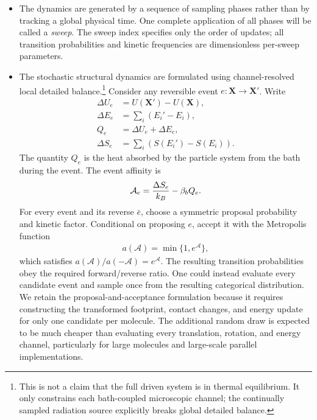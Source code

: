 \documentclass[12pt,letterpaper]{article}
\newcommand{\mb}{\mathbf}
\newcommand{\mc}{\mathcal}
\begin{document}
\begin{itemize}
The nearest-neighbor edges of the square lattice are partitioned into four matching classes according to orientation and parity. Within a class no two edges share an endpoint, so all proposals are sampled in parallel. The four classes are applied sequentially in a newly randomized order, with energies recalculated after each class. Bonded particles conduct more frequently than particles in ordinary contact, so molecular topology controls transport kinetics without changing the equilibrium energy law. Energy remains localized on particles rather than being averaged over a molecule, allowing molecules to maintain fluctuating gradients and localized hot regions.
\item The dynamics are generated by a sequence of sampling phases rather than by tracking a global physical time. One complete application of all phases will be called a \emph{sweep}. The sweep index specifies only the order of updates; all transition probabilities and kinetic frequencies are dimensionless per-sweep parameters.
\item The stochastic structural dynamics are formulated using channel-resolved local detailed balance.\footnote{This is not a claim that the full driven system is in thermal equilibrium. It only constrains each bath-coupled microscopic channel; the continually sampled radiation source explicitly breaks global detailed balance.} Consider any reversible event $e:\mb{X}\to\mb{X}'$. Write
\begin{align*}
\Delta U_{e} &= U(\mb{X}')-U(\mb{X}), \\
\Delta E_{e} &= \sum_{i}(E_{i}'-E_{i}), \\
Q_{e} &= \Delta U_{e}+\Delta E_{e}, \\
\Delta S_{e} &= \sum_{i}\left(S(E_{i}')-S(E_{i})\right).
\end{align*}
The quantity $Q_{e}$ is the heat absorbed by the particle system from the bath during the event. The event affinity is
\begin{align*}
\mc{A}_{e} = {\Delta S_{e} \over k_{B}}-\beta_{b}Q_{e}.
\end{align*}
For every event and its reverse $\bar e$, choose a symmetric proposal probability and kinetic factor. Conditional on proposing $e$, accept it with the Metropolis function
\begin{align*}
a(\mc{A}) = \min\{1,e^{\mc{A}}\},
\end{align*}
which satisfies $a(\mc{A})/a(-\mc{A})=e^{\mc{A}}$. The resulting transition probabilities obey the required forward/reverse ratio. One could instead evaluate every candidate event and sample once from the resulting categorical distribution. We retain the proposal-and-acceptance formulation because it requires constructing the transformed footprint, contact changes, and energy update for only one candidate per molecule. The additional random draw is expected to be much cheaper than evaluating every translation, rotation, and energy channel, particularly for large molecules and large-scale parallel implementations.

\end{itemize}
\end{document}

